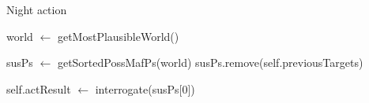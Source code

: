 \begin{algorithm}
	\caption{Night action}
	\begin{algorithmic}[1]
		\State world $\gets$ getMostPlausibleWorld()

		\State susPs $\gets$ getSortedPossMafPs(world)
		\State susPs.remove(self.previousTargets)

		\State self.actResult $\gets$ interrogate(susPs[0])
		\EndIf
		\EndFunction

		\Statex
	\end{algorithmic}
\end{algorithm}

















